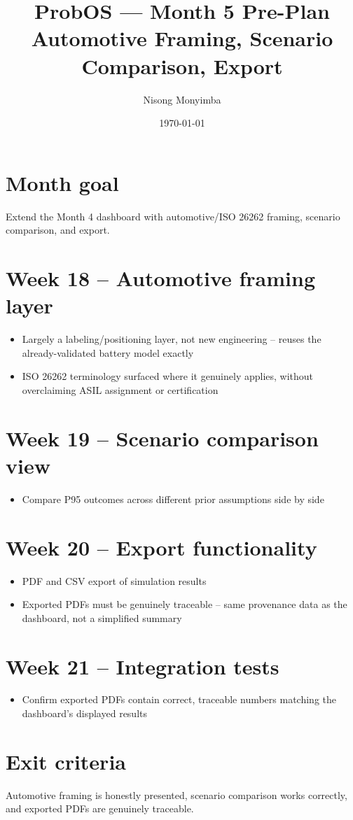 \documentclass[11pt]{article}
\title{ProbOS --- Month 5 Pre-Plan\\Automotive Framing, Scenario Comparison, Export}
\author{Nisong Monyimba}
\date{\today}
\begin{document}
\maketitle

\section*{Month goal}
Extend the Month 4 dashboard with automotive/ISO 26262 framing,
scenario comparison, and export.

\section*{Week 18 -- Automotive framing layer}
\begin{itemize}[leftmargin=*]
  \item Largely a labeling/positioning layer, not new engineering --
    reuses the already-validated battery model exactly
  \item ISO 26262 terminology surfaced where it genuinely applies,
    without overclaiming ASIL assignment or certification
\end{itemize}

\section*{Week 19 -- Scenario comparison view}
\begin{itemize}[leftmargin=*]
  \item Compare P95 outcomes across different prior assumptions side
    by side
\end{itemize}

\section*{Week 20 -- Export functionality}
\begin{itemize}[leftmargin=*]
  \item PDF and CSV export of simulation results
  \item Exported PDFs must be genuinely traceable -- same provenance
    data as the dashboard, not a simplified summary
\end{itemize}

\section*{Week 21 -- Integration tests}
\begin{itemize}[leftmargin=*]
  \item Confirm exported PDFs contain correct, traceable numbers
    matching the dashboard's displayed results
\end{itemize}

\section*{Exit criteria}
Automotive framing is honestly presented, scenario comparison works
correctly, and exported PDFs are genuinely traceable.
\end{document}
